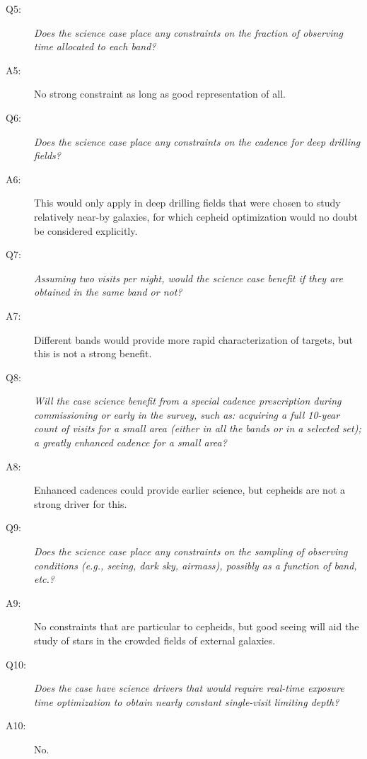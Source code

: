\begin{description}
 \item[Q5:] {\it Does the science case place any constraints on the
 fraction of observing time allocated to each band?}

 \item[A5:] No strong constraint as long as good representation of all.

 \item[Q6:] {\it Does the science case place any constraints on the
 cadence for deep drilling fields?}

 \item[A6:]  This would only apply in deep drilling fields that were chosen to study relatively near-by galaxies, for which cepheid 
optimization would no doubt be considered explicitly.

 \item[Q7:] {\it Assuming two visits per night, would the science case
 benefit if they are obtained in the same band or not?}

 \item[A7:] Different bands would provide more rapid characterization of targets, but this is not a strong benefit.

 \item[Q8:] {\it Will the case science benefit from a special cadence
 prescription during commissioning or early in the survey, such as:
 acquiring a full 10-year count of visits for a small area (either in all
 the bands or in a  selected set); a greatly enhanced cadence for a small
 area?}

 \item[A8:]  Enhanced cadences could provide earlier science, but 
cepheids are not a strong driver for this.

 \item[Q9:] {\it Does the science case place any constraints on the
 sampling of observing conditions (e.g., seeing, dark sky, airmass),
 possibly as a function of band, etc.?}

 \item[A9:] No constraints that are particular to cepheids, but good seeing will aid the study of stars in the crowded fields of 
external galaxies.

 \item[Q10:] {\it Does the case have science drivers that would require
 real-time exposure time optimization to obtain nearly constant
 single-visit limiting depth?}

 \item[A10:] No.

 \end{description}
